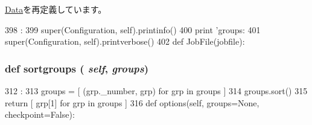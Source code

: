 \hyperlink{classm5_1_1util_1_1jobfile_1_1Data_a40bc1aa85be1c4ba18cd144234c53984}{Data}を再定義しています。


\begin{DoxyCode}
398                        :
399         super(Configuration, self).printinfo()
400         print 'groups: %
401         super(Configuration, self).printverbose()
402 
def JobFile(jobfile):
\end{DoxyCode}
\hypertarget{classm5_1_1util_1_1jobfile_1_1Configuration_a699d9fb6537280021513b63fc7765885}{
\subsubsection[{sortgroups}]{\setlength{\rightskip}{0pt plus 5cm}def sortgroups ( {\em self}, \/   {\em groups})}}
\label{classm5_1_1util_1_1jobfile_1_1Configuration_a699d9fb6537280021513b63fc7765885}



\begin{DoxyCode}
312                                 :
313         groups = [ (grp._number, grp) for grp in groups ]
314         groups.sort()
315         return [ grp[1] for grp in groups ]
316 
    def options(self, groups=None, checkpoint=False):
\end{DoxyCode}


